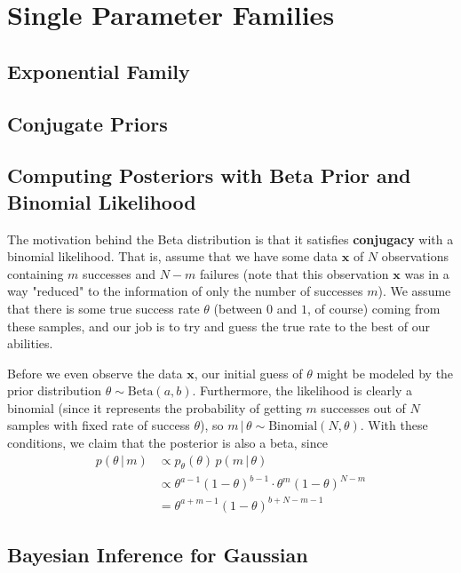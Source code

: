 \section{Single Parameter Families} 

\subsection{Exponential Family}

\subsection{Conjugate Priors}

\subsection{Computing Posteriors with Beta Prior and Binomial Likelihood}

  The motivation behind the Beta distribution is that it satisfies \textbf{conjugacy} with a binomial likelihood. That is, assume that we have some data $\mathbf{x}$ of $N$ observations containing $m$ successes and $N-m$ failures (note that this observation $\mathbf{x}$ was in a way "reduced" to the information of only the number of successes $m$). We assume that there is some true success rate $\theta$ (between $0$ and $1$, of course) coming from these samples, and our job is to try and guess the true rate to the best of our abilities.

  Before we even observe the data $\mathbf{x}$, our initial guess of $\theta$ might be modeled by the prior distribution $\theta \sim \text{Beta}(a, b)$. Furthermore, the likelihood is clearly a binomial (since it represents the probability of getting $m$ successes out of $N$ samples with fixed rate of success $\theta$), so $m\,|\,\theta \sim \text{Binomial}(N, \theta)$. With these conditions, we claim that the posterior is also a beta, since
  \begin{align*}
    p(\theta\,|\, m) & \propto p_\theta (\theta) \, p(m\,|\,\theta) \\
    & \propto \theta^{a - 1} (1 - \theta)^{b - 1} \cdot \theta^m (1 - \theta)^{N - m} \\
    & = \theta^{a + m - 1} (1 - \theta)^{b + N - m - 1}
  \end{align*}

\subsection{Bayesian Inference for Gaussian}

